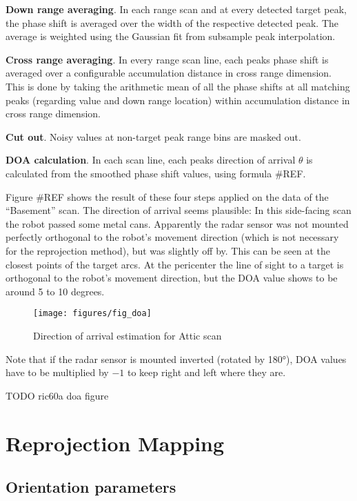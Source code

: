 \textbf{Down range averaging}. In each range scan and at every
detected target peak, the phase shift is averaged over the width of the
respective detected peak. The average is weighted using the Gaussian fit
from subsample peak interpolation.

\textbf{Cross range averaging}. In
every range scan line, each peaks phase shift is averaged over a
configurable accumulation distance in cross range dimension. This is
done by taking the arithmetic mean of all the phase shifts at all
matching peaks (regarding value and down range location) within
accumulation distance in cross range dimension.

\textbf{Cut out}. Noisy
values at non-target peak range bins are masked out.

\textbf{DOA
calculation}. In each scan line, each peaks direction of arrival
\(\theta\) is calculated from the smoothed phase shift values, using
formula \#REF.

Figure \#REF shows the result of these four steps applied on the data of
the ``Basement'' scan. The direction of arrival seems plausible: In this
side-facing scan the robot passed some metal cans. Apparently the radar
sensor was not mounted perfectly orthogonal to the robot's movement
direction (which is not necessary for the reprojection method), but was
slightly off by. This can be seen at the closest points of the target
arcs. At the pericenter the line of sight to a target is orthogonal to
the robot's movement direction, but the DOA value shows to be around 5
to 10 degrees.

\begin{figure}[htbp]
    \centering
    \label{fig:fig_doa}
    \texttt{[image: figures/fig\_doa]}
    \caption{Direction of arrival estimation for Attic scan}
\end{figure}

Note that if the radar sensor is mounted inverted (rotated by 180°), DOA
values have to be multiplied by \(-1\) to keep right and left where they
are.

TODO ric60a doa figure

\section{Reprojection Mapping}\label{reprojection-mapping}

\subsection{Orientation parameters}\label{orientation-parameters}

